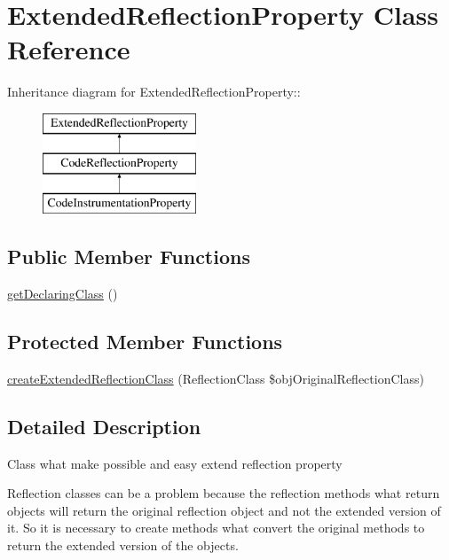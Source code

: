 \hypertarget{class_extended_reflection_property}{
\section{ExtendedReflectionProperty Class Reference}
\label{class_extended_reflection_property}
}
Inheritance diagram for ExtendedReflectionProperty::\begin{figure}[H]
\begin{center}
\leavevmode
\includegraphics[height=3cm]{class_extended_reflection_property}
\end{center}
\end{figure}
\subsection*{Public Member Functions}
\begin{CompactItemize}
\item 
\hyperlink{class_extended_reflection_property_acff3f8d93cc250281f0f73bff3422e1}{getDeclaringClass} ()
\end{CompactItemize}
\subsection*{Protected Member Functions}
\begin{CompactItemize}
\item 
\hyperlink{class_extended_reflection_property_6b56ec198bc6a5b5a72076e4e7c19e29}{createExtendedReflectionClass} (ReflectionClass \$objOriginalReflectionClass)
\end{CompactItemize}


\subsection{Detailed Description}
Class what make possible and easy extend reflection property

Reflection classes can be a problem because the reflection methods what return objects will return the original reflection object and not the extended version of it. So it is necessary to create methods what convert the original methods to return the extended version of the objects.

